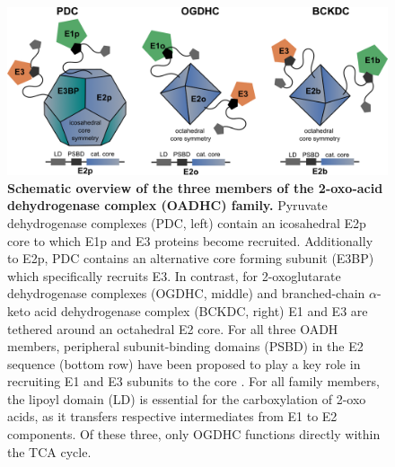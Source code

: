 \begin{figure}[t!]
	\centering
	\includegraphics[]{Chapter.5/Figures/Figure1.png}
	\caption{\textbf{Schematic overview of the three members of the 2-oxo-acid dehydrogenase complex (OADHC) family.} Pyruvate dehydrogenase complexes (PDC, left) contain an icosahedral E2p core to which E1p and E3 proteins become recruited. Additionally to E2p, PDC contains an alternative core forming subunit (E3BP) which specifically recruits E3. In contrast, for 2-oxoglutarate dehydrogenase complexes (OGDHC, middle) and branched-chain $\alpha$-keto acid dehydrogenase complex (BCKDC, right) E1 and E3 are tethered around an octahedral E2 core. For all three OADH members, peripheral subunit-binding domains (PSBD) in the E2 sequence (bottom row) have been proposed to play a key role in recruiting E1 and E3 subunits to the core \cite{Perham_2000}. For all family members, the lipoyl domain (LD) is essential for the carboxylation of 2-oxo acids, as it transfers respective intermediates from E1 to E2 components. Of these three, only OGDHC functions directly within the TCA cycle.}
	\label{fig:ch5_fig1}
\end{figure}

